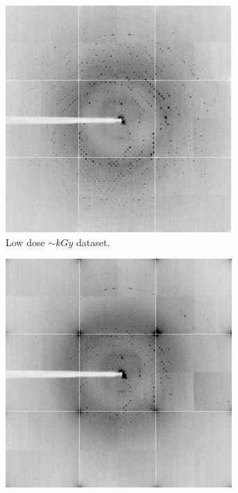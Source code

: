         \begin{figure}
            \centering
            \begin{subfigure}[b]{0.45\textwidth}
                    \centering
                    \includegraphics[width=\textwidth]{figures/introduction/intensityloss_kGydose.png}
                    \caption{Low dose $\sim kGy$ dataset.}
                    \label{fig:Intensity decay insulin diffraction image kGy}
            \end{subfigure}
            \quad
            \begin{subfigure}[b]{0.45\textwidth}
                    \centering
                    \includegraphics[width=\textwidth]{figures/introduction/intensityloss_30MGy.png}

\end{subfigure}
\end{figure}
